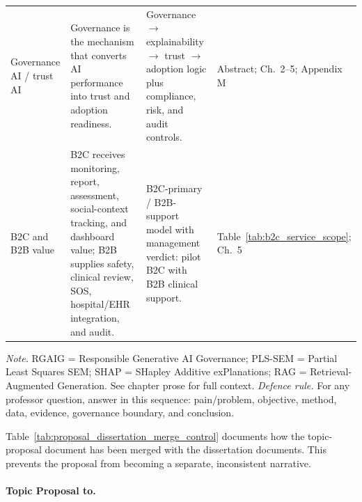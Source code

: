 {\begin{xltabular}{\textwidth}{@{} >{\raggedright\arraybackslash}p{2.1cm} p{5.0cm} p{5.0cm} >{\raggedright\arraybackslash}p{2.1cm} @{}}
\addlinespace
Governance AI / trust AI & Governance is the mechanism that converts AI performance into trust and adoption readiness. & Governance $\rightarrow$ explainability $\rightarrow$ trust $\rightarrow$ adoption logic plus compliance, risk, and audit controls. & Abstract; Ch.~2--5; Appendix M \\
\addlinespace
B2C and B2B value & B2C receives monitoring, report, assessment, social-context tracking, and dashboard value; B2B supplies safety, clinical review, SOS, hospital/EHR integration, and audit. & B2C-primary / B2B-support model with management verdict: pilot B2C with B2B clinical support. & Table~\ref{tab:b2c_service_scope}; Ch.~5 \\
\end{xltabular}}
\vspace{0.3em}\noindent\textit{Note.} RGAIG = Responsible Generative AI Governance; PLS-SEM = Partial Least Squares SEM; SHAP = SHapley Additive exPlanations; RAG = Retrieval-Augmented Generation. See chapter prose for full context.
\vspace{0.5em}
\noindent\textit{Defence rule.} For any professor question, answer in this sequence: pain/problem, objective, method, data, evidence, governance boundary, and conclusion.

\noindent Table~\ref{tab:proposal_dissertation_merge_control} documents how the topic-proposal document has been merged with the dissertation documents. This prevents the proposal from becoming a separate, inconsistent narrative.

\paragraph{Topic Proposal to.}



\clearpage

